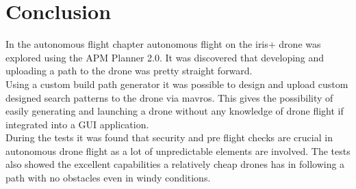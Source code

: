 \chapter{Conclusion}

In the autonomous flight chapter autonomous flight on the iris+ drone was explored using the APM Planner 2.0. It was discovered that developing and uploading a path to the drone was pretty straight forward.\\

Using a custom build path generator it was possible to design and upload custom designed search patterns to the drone via mavros. This gives the possibility of easily generating and launching a drone without any knowledge of drone flight if integrated into a GUI application.\\

During the tests it was found that security and pre flight checks are crucial in autonomous drone flight as a lot of unpredictable elements are involved. The tests also showed the excellent capabilities a relatively cheap drones has in following a path with no obstacles even in windy conditions.\\

\newpage